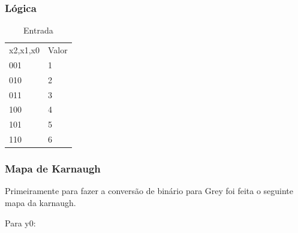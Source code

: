 \documentclass{article}
\begin{document}
\subsubsection{Lógica}
\begin{table}[h]
 \centering
 {\renewcommand\arraystretch{1.25}
 \caption{Entrada}
 \begin{tabular}{ l l }
  \cline{1-1}\cline{2-2}  
    \multicolumn{1}{|p{3.850cm}|}{x2,x1,x0 \centering } &
    \multicolumn{1}{p{4.217cm}|}{Valor \centering }
  \\  
  \cline{1-1}\cline{2-2}  
    \multicolumn{1}{|p{3.850cm}|}{001 \centering } &
    \multicolumn{1}{p{4.217cm}|}{1 \centering }
  \\  
  \cline{1-1}\cline{2-2}  
    \multicolumn{1}{|p{3.850cm}|}{010 \centering } &
    \multicolumn{1}{p{4.217cm}|}{2 \centering }
  \\  
  \cline{1-1}\cline{2-2}  
    \multicolumn{1}{|p{3.850cm}|}{011 \centering } &
    \multicolumn{1}{p{4.217cm}|}{3 \centering }
  \\  
  \cline{1-1}\cline{2-2}  
    \multicolumn{1}{|p{3.850cm}|}{100 \centering } &
    \multicolumn{1}{p{4.217cm}|}{4 \centering }
  \\  
  \cline{1-1}\cline{2-2}  
    \multicolumn{1}{|p{3.850cm}|}{101 \centering } &
    \multicolumn{1}{p{4.217cm}|}{5 \centering }
  \\  
  \cline{1-1}\cline{2-2}  
    \multicolumn{1}{|p{3.850cm}|}{110 \centering } &
    \multicolumn{1}{p{4.217cm}|}{6 \centering }
  \\  
  \hline

 \end{tabular} }
\end{table}

\subsubsection{Mapa de Karnaugh}

Primeiramente para fazer a conversão de binário para Grey foi feita o seguinte mapa da karnaugh.

Para y0:
\end{document}
